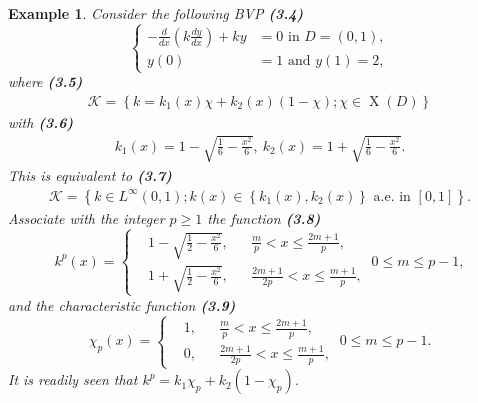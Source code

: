 \documentclass{book}
\numberwithin{equation}{section}
\newtheorem{example}{Example}[section]
\begin{document}
\begin{enumerate}
    \begin{example}
        Consider the following BVP \textbf{(3.4)}
        \begin{equation*}
            \left\{\begin{split}
                -\frac{d}{dx}\left(k\frac{dy}{dx}\right) + ky &= 0 \mbox{ in } D= (0,1),\\
                y(0) &= 1 \mbox{ and } y(1) = 2,
            \end{split}\right.
        \end{equation*}
        where \textbf{(3.5)}
        \begin{align*}
            \mathcal{K} = \left\{k = k_1(x)\chi + k_2(x)(1 - \chi);\chi\in\operatorname{X}(D)\right\}
        \end{align*}
        with \textbf{(3.6)}
        \begin{align*}
            k_1(x) = 1 - \sqrt{\frac{1}{6} - \frac{x^2}{6}},\ k_2(x) = 1 + \sqrt{\frac{1}{6} - \frac{x^2}{6}}.
        \end{align*}
        This is equivalent to \textbf{(3.7)}
        \begin{align*}
            \mathcal{K} = \left\{k\in L^\infty(0,1);k(x)\in\left\{k_1(x),k_2(x)\right\} \mbox{ a.e. in } [0,1]\right\}.
        \end{align*}
        Associate with the integer $p\ge 1$ the function \textbf{(3.8)}
        \begin{equation*}
            k^p(x) = \left\{\begin{split}
                &1 - \sqrt{\frac{1}{2} - \frac{x^2}{6}}, &&\frac{m}{p} < x\le\frac{2m + 1}{p},\\
                &1 + \sqrt{\frac{1}{2} - \frac{x^2}{6}}, &&\frac{2m + 1}{2p} < x\le\frac{m + 1}{p},
            \end{split}\right.\ 0\le m\le p - 1,
        \end{equation*}
        and the characteristic function \textbf{(3.9)}
        \begin{equation*}
            \chi_p(x) = \left\{\begin{split}
                &1, &&\frac{m}{p} < x\le\frac{2m + 1}{p},\\
                &0, &&\frac{2m + 1}{2p} < x\le\frac{m + 1}{p},
            \end{split}\right.\ 0\le m\le p - 1.
        \end{equation*}
        It is readily seen that $k^p = k_1\chi_p + k_2\left(1 - \chi_p\right)$.
        

\end{example}
\end{enumerate}
\end{document}
